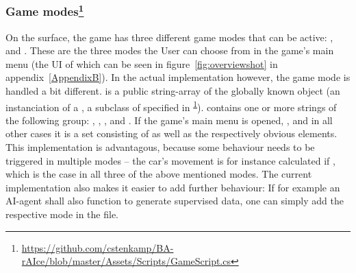 

\subsubsection{Game modes\footnote{\label{gamescript}\url{https://github.com/cstenkamp/BA-rAIce/blob/master/Assets/Scripts/GameScript.cs}}}

On the surface, the game has three different game modes that can be active: ,  and . These are the three modes the User can choose from in the game's main menu (the UI of which can be seen in figure~\ref{fig:overviewshot} in appendix~\ref{AppendixB}). In the actual implementation however, the game mode is handled a bit different.  is a public string-array of the globally known object  (an instanciation of a , a subclass of  specified in \textsuperscript{\ref{gamescript}}).  contains one or more strings of the following group: , , ,  and . If the game's main menu is opened, , and in all other cases it is a set consisting of  as well as the respectively obvious elements. This implementation is advantagous, because some behaviour needs to be triggered in multiple modes -- the car's movement is for instance calculated if , which is the case in all three of the above mentioned modes. The current implementation also makes it easier to add further behaviour: If for example an AI-agent shall also function to generate supervised data, one can simply add the respective mode in the  file.

